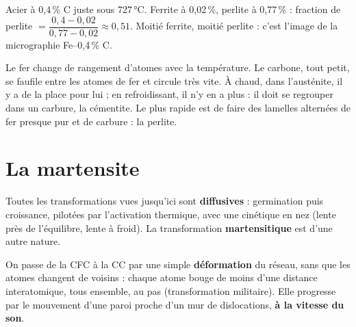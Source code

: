 \begin{exbox}[title={Exemple chiffré (pas dans les diapositives)}]
Acier à 0,4\,\% C juste sous 727\,°C. Ferrite à 0,02\,\%, perlite à 0,77\,\% :
fraction de perlite $= \dfrac{0{,}4 - 0{,}02}{0{,}77 - 0{,}02} \approx 0{,}51$. Moitié ferrite,
moitié perlite : c'est l'image de la micrographie Fe--0,4\,\% C.
\end{exbox}

\begin{goatbox}
Le fer change de rangement d'atomes avec la température. Le carbone, tout petit, se faufile entre
les atomes de fer et circule très vite. À chaud, dans l'austénite, il y a de la place pour lui ;
en refroidissant, il n'y en a plus : il doit se regrouper dans un carbure, la cémentite. Le plus
rapide est de faire des lamelles alternées de fer presque pur et de carbure : la perlite.
\end{goatbox}

\section{La martensite}

Toutes les transformations vues jusqu'ici sont \textbf{diffusives} : germination puis
croissance, pilotées par l'activation thermique, avec une cinétique en nez (lente près de
l'équilibre, lente à froid). La transformation \textbf{martensitique} est d'une autre nature.


\begin{defnbox}[title={Transformation martensitique (displacive)}]
On passe de la CFC à la CC par une simple \textbf{déformation} du réseau, sans que les atomes
changent de voisins : chaque atome bouge de moins d'une distance interatomique, tous ensemble,
\og au pas\fg{} (transformation \og militaire\fg{}). Elle progresse par le mouvement d'une
paroi proche d'un mur de dislocations, \textbf{à la vitesse du son}.
\end{defnbox}

